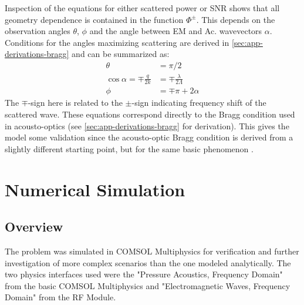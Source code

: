\documentclass[11pt,twoside]{eitExjobb}
\begin{document}
	Inspection of the equations for either scattered power or SNR shows that all geometry dependence is contained in the function $\Phi^\pm$. This depends on the observation angles $\theta$, $\phi$ and the angle between EM and Ac. wavevectors $\alpha$. Conditions for the angles maximizing scattering are derived in \ref{sec:app-derivations-bragg} and can be summarized as:
	\begin{align}
		\theta &= \pi/2 \label{eq:an-bragg-theta} \\
		\cos{\alpha} = \mp \frac{q}{2k} &= \mp \frac{\lambda}{2\Lambda} \label{eq:an-bragg-alpha} \\
		\phi &= \mp \pi + 2\alpha \label{eq:an-bragg-phi}
	\end{align}
	The $\mp$-sign here is related to the $\pm$-sign indicating frequency shift of the scattered wave. These equations correspond directly to the Bragg condition used in acousto-optics (see \ref{sec:app-derivations-bragg} for derivation). This gives the model some validation since the acousto-optic Bragg condition is derived from a slightly different starting point, but for the same basic phenomenon \cite{Saleh2007}.
	
	
	\chapter{Numerical Simulation}
	
	\section{Overview}
	The problem was simulated in COMSOL Multiphysics for verification and further investigation of more complex scenarios than the one modeled analytically. The two physics interfaces used were the "Pressure Acoustics, Frequency Domain" from the basic COMSOL Multiphysics and "Electromagnetic Waves, Frequency Domain" from the RF Module.
	
	
\end{document}
